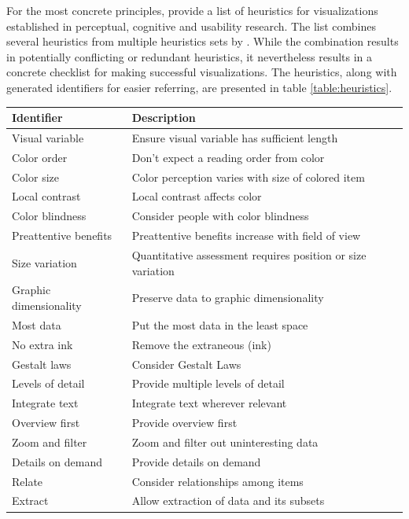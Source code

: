 For the most concrete principles, \citet{zuk_heuristics_2006} provide a list of heuristics for visualizations established in perceptual, cognitive and usability research. The list combines several heuristics from multiple heuristics sets by \citet{shneiderman_eyes_1996,zuk_theoretical_2006,amar_knowledge_2004}. While the combination results in potentially conflicting or redundant heuristics, it nevertheless results in a concrete checklist for making successful visualizations. The heuristics, along with generated identifiers for easier referring, are presented in table \ref{table:heuristics}.

\begin{table}
\begin{tabular}{|p{4.2cm}|p{8.8cm}|}
\hline
\textbf{Identifier} & \textbf{Description} \\ 
\hline
Visual variable & Ensure visual variable has sufficient length \\
Color order & Don't expect a reading order from color \\
Color size & Color perception varies with size of colored item \\
Local contrast & Local contrast affects color \\
Color blindness & Consider people with color blindness \\
Preattentive benefits & Preattentive benefits increase with field of view \\
Size variation & Quantitative assessment requires position or size variation \\
Graphic dimensionality & Preserve data to graphic dimensionality \\
Most data & Put the most data in the least space \\
No extra ink & Remove the extraneous (ink) \\
Gestalt laws & Consider Gestalt Laws \\
Levels of detail & Provide multiple levels of detail \\
Integrate text & Integrate text wherever relevant \\
Overview first & Provide overview first \\
Zoom and filter & Zoom and filter out uninteresting data \\
Details on demand & Provide details on demand \\
Relate &  Consider relationships among items \\
Extract & Allow extraction of data and its subsets \\

\end{tabular}
\end{table}
